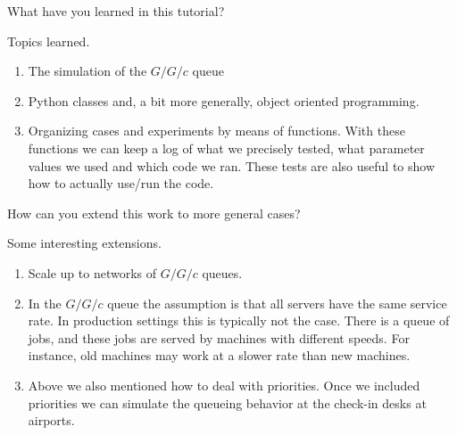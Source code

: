 \documentclass{scrartcl}
\begin{document}
\begin{exercise}
  What have you learned in this tutorial?
  \begin{solution}
    Topics learned.
    \begin{enumerate}
    \item The simulation of the $G/G/c$ queue
    \item Python classes and, a bit more generally, object oriented programming. 
    \item Organizing cases and experiments by means of  functions. With these functions we can keep a log of what we precisely tested, what parameter values we used and which code we ran. These tests are also useful to show how to actually use/run the code.
    \end{enumerate}
  \end{solution}
\end{exercise}

\begin{exercise}
 How can you extend this work to more general cases? 
  \begin{solution}
Some  interesting extensions.
    \begin{enumerate}
    \item   Scale up to networks of $G/G/c$ queues.
    \item In the $G/G/c$ queue the assumption is that all servers have the same service rate. In production settings this is typically not the case. There is a queue of jobs, and these jobs are served by machines with different speeds. For instance, old machines may work at a slower rate than new machines. 
    \item Above we also mentioned how to deal with priorities. Once we included priorities we can simulate the queueing behavior at the check-in desks at airports. 
    \end{enumerate}
  \end{solution}
\end{exercise}

\clearpage





\end{document}
